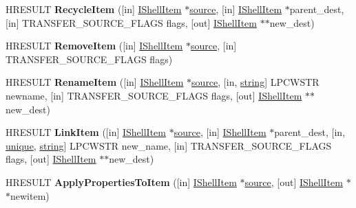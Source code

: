 \begin{DoxyCompactItemize}
H\+R\+E\+S\+U\+LT {\bfseries Recycle\+Item} (\mbox{[}in\mbox{]} \hyperlink{interface_i_shell_item}{I\+Shell\+Item} $\ast$\hyperlink{structsource}{source}, \mbox{[}in\mbox{]} \hyperlink{interface_i_shell_item}{I\+Shell\+Item} $\ast$parent\+\_\+dest, \mbox{[}in\mbox{]} T\+R\+A\+N\+S\+F\+E\+R\+\_\+\+S\+O\+U\+R\+C\+E\+\_\+\+F\+L\+A\+GS flags, \mbox{[}out\mbox{]} \hyperlink{interface_i_shell_item}{I\+Shell\+Item} $\ast$$\ast$new\+\_\+dest)
\item 
\mbox{\label{interface_i_transfer_source_afbe836303bff1811e9e3d829d068a6ea}} 
H\+R\+E\+S\+U\+LT {\bfseries Remove\+Item} (\mbox{[}in\mbox{]} \hyperlink{interface_i_shell_item}{I\+Shell\+Item} $\ast$\hyperlink{structsource}{source}, \mbox{[}in\mbox{]} T\+R\+A\+N\+S\+F\+E\+R\+\_\+\+S\+O\+U\+R\+C\+E\+\_\+\+F\+L\+A\+GS flags)
\item 
\mbox{\label{interface_i_transfer_source_a0f2f4c6b21ffe6fd4c090d0a0e904e8b}} 
H\+R\+E\+S\+U\+LT {\bfseries Rename\+Item} (\mbox{[}in\mbox{]} \hyperlink{interface_i_shell_item}{I\+Shell\+Item} $\ast$\hyperlink{structsource}{source}, \mbox{[}in, \hyperlink{structstring}{string}\mbox{]} L\+P\+C\+W\+S\+TR newname, \mbox{[}in\mbox{]} T\+R\+A\+N\+S\+F\+E\+R\+\_\+\+S\+O\+U\+R\+C\+E\+\_\+\+F\+L\+A\+GS flags, \mbox{[}out\mbox{]} \hyperlink{interface_i_shell_item}{I\+Shell\+Item} $\ast$$\ast$new\+\_\+dest)
\item 
\mbox{\label{interface_i_transfer_source_a047d5d7974ce9a1f0d2de956efcd5d96}} 
H\+R\+E\+S\+U\+LT {\bfseries Link\+Item} (\mbox{[}in\mbox{]} \hyperlink{interface_i_shell_item}{I\+Shell\+Item} $\ast$\hyperlink{structsource}{source}, \mbox{[}in\mbox{]} \hyperlink{interface_i_shell_item}{I\+Shell\+Item} $\ast$parent\+\_\+dest, \mbox{[}in, \hyperlink{interfaceunique}{unique}, \hyperlink{structstring}{string}\mbox{]} L\+P\+C\+W\+S\+TR new\+\_\+name, \mbox{[}in\mbox{]} T\+R\+A\+N\+S\+F\+E\+R\+\_\+\+S\+O\+U\+R\+C\+E\+\_\+\+F\+L\+A\+GS flags, \mbox{[}out\mbox{]} \hyperlink{interface_i_shell_item}{I\+Shell\+Item} $\ast$$\ast$new\+\_\+dest)
\item 
\mbox{\label{interface_i_transfer_source_a72810327a14c4a6e2a48ed282395e95d}} 
H\+R\+E\+S\+U\+LT {\bfseries Apply\+Properties\+To\+Item} (\mbox{[}in\mbox{]} \hyperlink{interface_i_shell_item}{I\+Shell\+Item} $\ast$\hyperlink{structsource}{source}, \mbox{[}out\mbox{]} \hyperlink{interface_i_shell_item}{I\+Shell\+Item} $\ast$$\ast$newitem)

\end{DoxyCompactItemize}
